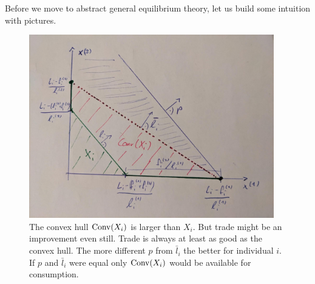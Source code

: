 \FloatBarrier
Before we move to abstract general equilibrium theory, let us build some
intuition with pictures.

\begin{figure}
	\includegraphics[width=0.95\textwidth]{images/conv_hull_vs_trade.jpeg}
	\centering
	\caption{
		The convex hull \(\operatorname{Conv}(X_i)\) is larger than \(X_i\). But trade might
		be an improvement even still. Trade is always at least as good as the
		convex hull. The more different \(p\) from \(\bar{l}_i\) the better for
		individual \(i\). If \(p\) and \(\bar{l}_i\) were equal only
		\(\operatorname{Conv}(X_i)\) would be available for consumption.
	}
\end{figure}

